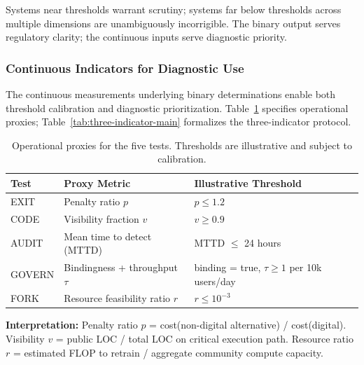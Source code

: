 Systems near thresholds warrant scrutiny; systems far below thresholds across multiple dimensions are unambiguously incorrigible. The binary output serves regulatory clarity; the continuous inputs serve diagnostic priority.

\subsubsection{Continuous Indicators for Diagnostic Use}

The continuous measurements underlying binary determinations enable both threshold calibration and diagnostic prioritization. Table~\ref{tab:operational-proxies-main} specifies operational proxies; Table~\ref{tab:three-indicator-main} formalizes the three-indicator protocol.

\begin{table}[htbp]
\centering
\caption{Operational proxies for the five tests. Thresholds are illustrative and subject to calibration.}
\label{tab:operational-proxies-main}
\begin{tabular}{lll}
\toprule
\textbf{Test} & \textbf{Proxy Metric} & \textbf{Illustrative Threshold} \\
\midrule
EXIT & Penalty ratio $p$ & $p \leq 1.2$ \\
CODE & Visibility fraction $v$ & $v \geq 0.9$ \\
AUDIT & Mean time to detect (MTTD) & MTTD $\leq$ 24 hours \\
GOVERN & Bindingness + throughput $\tau$ & binding = true, $\tau \geq 1$ per 10k users/day \\
FORK & Resource feasibility ratio $r$ & $r \leq 10^{-3}$ \\
\bottomrule
\end{tabular}
\end{table}

\textbf{Interpretation:} Penalty ratio $p$ = cost(non-digital alternative) / cost(digital). Visibility $v$ = public LOC / total LOC on critical execution path. Resource ratio $r$ = estimated FLOP to retrain / aggregate community compute capacity.


